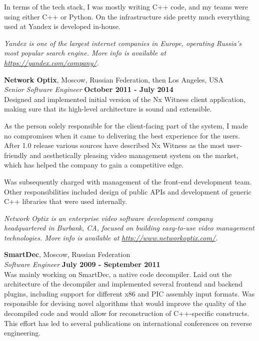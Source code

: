 \documentclass[margin,line]{CV}
\begin{document}
\begin{resume}
    In terms of the tech stack, I was mostly writing C++ code, and my teams were using either C++ or Python. On the infrastructure side pretty much everything used at Yandex is developed in-house.

\ifdefined\superofficial
    {\footnotesize\textit{Yandex is one of the largest internet companies in Europe, operating Russia's most popular search engine. More info is available at \url{https://yandex.com/company/}.}}
\fi 


    \vspace{2mm}
    \textbf{Network Optix}, Moscow, Russian Federation, then Los Angeles, USA\vspace{1mm}\\
    \textsl{Senior Software Engineer} \hfill \textbf{October 2011 - July 2014}\vspace{1mm}\\ 
    Designed and implemented initial version of the Nx Witness client application, making sure that its high-level architecture is sound and extensible.

    As the person solely responsible for the client-facing part of the system, I made no compromises when it came to delivering the best experience for the users. After 1.0 release various sources have described Nx Witness as the most user-friendly and aesthetically pleasing video management system on the market, which has helped the company to gain a competitive edge.

    Was subsequently charged with management of the front-end development team. Other responsibilities included design of public APIs and development of generic C++ libraries that were used internally.
    
\ifdefined\superofficial
    {\footnotesize\textit{Network Optix is an enterprise video software development company headquartered in Burbank, CA, focused on building easy-to-use video management technologies. More info is available at \url{http://www.networkoptix.com/}.}}
\fi
    
    
    \vspace{2mm}    
    \textbf{SmartDec}, Moscow, Russian Federation\vspace{1mm}\\
    \textsl{Software Engineer} \hfill \textbf{July 2009 - September 2011}\vspace{1mm}\\
    Was mainly working on SmartDec, a native code decompiler. Laid out the architecture of the decompiler and implemented several frontend and backend plugins, including support for different x86 and PIC assembly input formats. Was responsible for devising novel algorithms that would improve the quality of the decompiled code and would allow for reconstruction of C++-specific constructs. This effort has led to several publications on international conferences on reverse engineering.


\end{resume}
\end{document}
